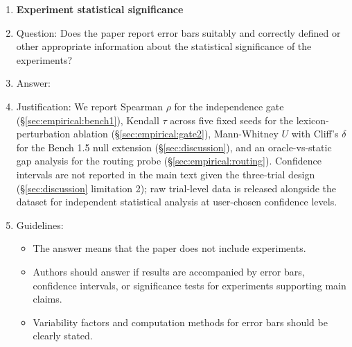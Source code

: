 \begin{enumerate}
\item {\bf Experiment statistical significance}
    \item[] Question: Does the paper report error bars suitably and correctly defined or other appropriate information about the statistical significance of the experiments?
    \item[] Answer: \answerYes{}
    \item[] Justification: We report Spearman $\rho$ for the independence gate (\S\ref{sec:empirical:bench1}), Kendall $\tau$ across five fixed seeds for the lexicon-perturbation ablation (\S\ref{sec:empirical:gate2}), Mann-Whitney $U$ with Cliff's $\delta$ for the Bench 1.5 null extension (\S\ref{sec:discussion}), and an oracle-vs-static gap analysis for the routing probe (\S\ref{sec:empirical:routing}). Confidence intervals are not reported in the main text given the three-trial design (\S\ref{sec:discussion} limitation 2); raw trial-level data is released alongside the dataset for independent statistical analysis at user-chosen confidence levels.
    \item[] Guidelines:
    \begin{itemize}
        \item The answer \answerNA{} means that the paper does not include experiments.
        \item Authors should answer \answerYes{} if results are accompanied by error bars, confidence intervals, or significance tests for experiments supporting main claims.
        \item Variability factors and computation methods for error bars should be clearly stated.
    \end{itemize}


\end{enumerate}
